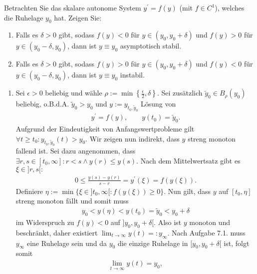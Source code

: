 \begin{exercise}
Betrachten Sie das skalare autonome System $y^{\prime} = f(y)$ (mit $f \in C^1$),
welches die Ruhelage $y_0$ hat. Zeigen Sie:
\begin{enumerate}[label = \textbf{\alph*)}]
  \item Falls es $\delta > 0$ gibt, sodass $f(y) < 0$ für $y \in (y_0,y_0 + \delta)$
und $f(y) > 0$ für $y \in (y_0 - \delta, y_0)$, dann ist $y \equiv y_0$
asymptotisch stabil.
\item Falls es $\delta > 0$ gibt, sodass $f(y) > 0$ für $y \in (y_0,y_0 + \delta)$
und $f(y) < 0$ für $y \in (y_0 - \delta, y_0)$, dann ist $y \equiv y_0$ instabil.
\end{enumerate}
\end{exercise}
\begin{solution}
  \phantom{}
\begin{enumerate}[label = \textbf{\alph*)}]
\item Sei $\epsilon > 0$ beliebig und wähle
$\rho := \min \left\{\frac{\epsilon}{2}, \delta \right\}$.
Sei zusätzlich $\widetilde{y}_0 \in B_{\rho}(y_0)$ beliebig, o.B.d.A. $\widetilde{y}_0 > y_0$
und $y := y_{t_0,\widetilde{y}_0}$ Lösung von
\begin{align*}
  y^{\prime} = f(y), \qquad y(t_0) = \widetilde{y}_0.
\end{align*}
Aufgrund der Eindeutigkeit von Anfangswertprobleme gilt
$\forall t \geq t_0: y_{t_0,\widetilde{y}_0}(t) > y_0$.
Wir zeigen nun indirekt, dass $y$ streng monoton fallend ist.
Sei dazu angenommen, dass $\exists r,s \in [t_0,\infty]: r < s \land y(r) \leq y(s)$.
Nach dem Mittelwertsatz gibt es $\xi \in ]r,s[:$
\begin{align*}
  0 \leq \frac{y(s)-y(r)}{s-r} = y^{\prime}(\xi) = f(y(\xi)).
\end{align*}
Definiere $\eta := \min \{\xi \in ]t_0,\infty[: f(y(\xi)) \geq 0 \}$.
Nun gilt, dass $y$ auf $[t_0, \eta]$ streng monoton fällt und somit muss
\begin{align*}
  y_0 < y(\eta) < y(t_0) = \widetilde{y}_0 < y_0 + \delta
\end{align*}
im Widerspruch zu $f(y) < 0$ auf $]y_0,y_0 + \delta[$.
Also ist $y$ monoton und beschränkt, daher existiert $\lim_{t \to \infty} y(t) =: y_{\infty}$.
Nach Aufgabe 7.1. muss $y_{\infty}$ eine Ruhelage sein und da $y_0$ die einzige
Ruhelage in $[y_0,y_0 + \delta[$ ist, folgt somit
\begin{align*}
  \lim_{t \to \infty} y(t) = y_0,
\end{align*}

\end{enumerate}
\end{solution}
